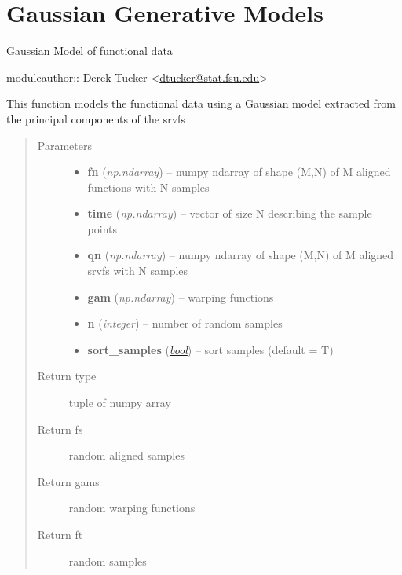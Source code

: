 \documentclass[letterpaper,10pt,english]{sphinxmanual}
\begin{document}
\chapter{Gaussian Generative Models}
\label{gauss_model::doc}\label{gauss_model:module-gauss_model}\label{gauss_model:gaussian-generative-models}
Gaussian Model of functional data

moduleauthor:: Derek Tucker \textless{}\href{mailto:dtucker@stat.fsu.edu}{dtucker@stat.fsu.edu}\textgreater{}

\begin{fulllineitems}
\label{gauss_model:gauss_model.gauss_model}
This function models the functional data using a Gaussian model extracted from the principal components of the srvfs
\begin{quote}\begin{description}
\item[{Parameters}] \leavevmode\begin{itemize}
\item {} 
\textbf{fn} (\emph{np.ndarray}) -- numpy ndarray of shape (M,N) of M aligned functions with N samples

\item {} 
\textbf{time} (\emph{np.ndarray}) -- vector of size N describing the sample points

\item {} 
\textbf{qn} (\emph{np.ndarray}) -- numpy ndarray of shape (M,N) of M aligned srvfs with N samples

\item {} 
\textbf{gam} (\emph{np.ndarray}) -- warping functions

\item {} 
\textbf{n} (\emph{integer}) -- number of random samples

\item {} 
\textbf{sort\_samples} (\href{http://docs.python.org/library/functions.html\#bool}{\emph{bool}}) -- sort samples (default = T)

\end{itemize}

\item[{Return type}] \leavevmode
tuple of numpy array

\item[{Return fs}] \leavevmode
random aligned samples

\item[{Return gams}] \leavevmode
random warping functions

\item[{Return ft}] \leavevmode
random samples

\end{description}\end{quote}

\end{fulllineitems}
\end{document}
